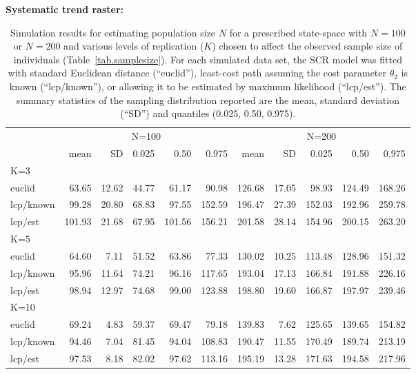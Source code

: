 \documentclass[12pt]{article}
\begin{document}
\begin{table}[h!]
{\small
\caption{Simulation results for estimating population size $N$ for a prescribed state-space with
$N=100$ or $N=200$ and various levels of replication ($K$) chosen to affect the observed sample
size of individuals (Table~\ref{tab.samplesize}). For each simulated data set, the SCR model was fitted with
standard Euclidean distance (``euclid''), least-cost path assuming the
cost parameter $\theta_2$ is known (``lcp/known''), or allowing it to
be estimated by maximum likelihood (``lcp/est'').
The summary statistics of the
sampling distribution reported are the mean, standard deviation
(``SD'') and quantiles (0.025, 0.50, 0.975).
}
{\bf Systematic trend raster:} \\
\begin{tabular}{l|rrrrr|rrrrr}
         & \multicolumn{5}{c}{N=100   } & \multicolumn{5}{c}{N=200  }  \\
         &   mean &  SD  & 0.025 & 0.50 & 0.975  & mean  & SD   & 0.025 & 0.50  & 0.975 \\ \hline
K=3      &        &      &       &      &        &       &      &       &       &       \\
euclid   &   63.65& 12.62& 44.77 & 61.17&  90.98 & 126.68& 17.05&  98.93& 124.49& 168.26 \\
lcp/known&   99.28& 20.80& 68.83 & 97.55& 152.59 & 196.47& 27.39& 152.03& 192.96& 259.78\\
lcp/est  &  101.93& 21.68& 67.95 &101.56& 156.21 & 201.58& 28.14& 154.96& 200.15& 263.20\\
K=5      &        &      &       &      &        &       &      &       &       &        \\
euclid   &  64.60 & 7.11 & 51.52 & 63.86&  77.33 & 130.02& 10.25& 113.48& 128.96& 151.32\\
lcp/known&  95.96 &11.64 & 74.21 & 96.16& 117.65 & 193.04& 17.13& 166.84& 191.88& 226.16\\
lcp/est  &  98.94 &12.97 & 74.68 & 99.00& 123.88 & 198.80& 19.60& 166.87& 197.97& 239.46\\
K=10     &        &      &       &      &        &       &      &       &       &       \\
euclid   &  69.24 & 4.83 & 59.37 & 69.47&  79.18 & 139.83&  7.62& 125.65& 139.65& 154.82\\
lcp/known&  94.46 & 7.04 & 81.45 & 94.04& 108.83 & 190.47& 11.55& 170.49& 189.74& 213.19\\
lcp/est  &  97.53 & 8.18 & 82.02 & 97.62& 113.16 & 195.19& 13.28& 171.63& 194.58& 217.96\\ \hline

\end{tabular}}
\end{table}
\end{document}
